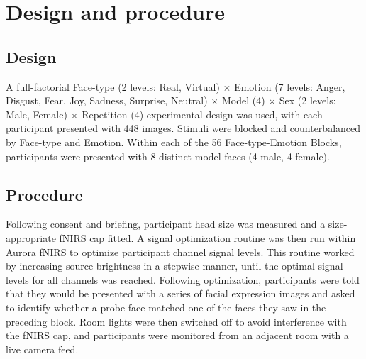 \section{Design and procedure}
\subsection{Design}
\label{sec:Design}
A full-factorial Face-type (2 levels: Real, Virtual) \texorpdfstring{$\times$}{x} Emotion (7 levels: Anger, Disgust, Fear, Joy, Sadness, Surprise, Neutral) \texorpdfstring{$\times$}{x} Model (4) \texorpdfstring{$\times$}{x} Sex (2 levels: Male, Female) \texorpdfstring{$\times$}{x} Repetition (4) experimental design was used, with each participant presented with 448 images. 
Stimuli were blocked and counterbalanced by Face-type and Emotion. 
Within each of the 56 Face-type-Emotion Blocks, participants were presented with 8 distinct model faces (4 male, 4 female).

\subsection{Procedure}
\label{sec:Procedure}
Following consent and briefing, participant head size was measured and a size-appropriate fNIRS cap fitted. 
A signal optimization routine was then run within Aurora fNIRS to optimize participant channel signal levels. 
This routine worked by increasing source brightness in a stepwise manner, until the optimal signal levels for all channels was reached. 
Following optimization, participants were told that they would be presented with a series of facial expression images and asked to identify whether a probe face matched one of the faces they saw in the preceding block. 
Room lights were then switched off to avoid interference with the fNIRS cap, and participants were monitored from an adjacent room with a live camera feed. 

